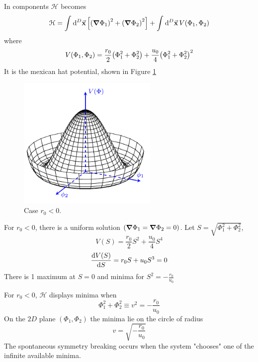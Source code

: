 \documentclass[../main/main.tex]{subfiles}
\begin{document}
In components \( \mathcal{H} \) becomes
\begin{equation}
  \mathcal{H} = \int_{}^{} \dd[D]{\va{x}} \qty[\qty(\grad \Phi _1)^2 + \qty(\grad \Phi _2)^2  ] + \int_{}^{} \dd[D]{\va{x}} V (\Phi _1, \Phi _2)
\end{equation}
where
\begin{equation}
  V (\Phi _1, \Phi _2) = \frac{r_0}{2} \qty(\Phi _1^2 + \Phi _2^2) + \frac{u_0}{4} \qty( \Phi _1^2 + \Phi _2^2)^2
\end{equation}
It is the mexican hat potential, shown in Figure \ref{fig:n_1}

\begin{figure}[h!]
\centering
\includegraphics[width=0.6\textwidth]{../lessons/n_image/3.pdf}
\caption{\label{fig:n_1} Case \( r_0 < 0 \).}
\end{figure}

For \( r_0 < 0 \), there is a uniform solution \( (\grad \Phi _1 = \grad \Phi _2 = 0) \). Let \( S = \sqrt{\Phi _1^2 + \Phi _2^2}  \),
\begin{equation}
  V (S) = \frac{r_0}{2} S^2 + \frac{u_0}{4} S^4
\end{equation}
\begin{equation}
  \dv{V(S)}{S} = r_0 S + u_0 S^3 = 0
\end{equation}
There is 1 maximum at \( S=0 \) and minima for \( S^2 = - \frac{r_0}{u_0} \)

For \( r_0 < 0 \), \( \mathcal{H} \) displays minima when
\begin{equation}
  \Phi _1^2 + \Phi _2^2 \equiv v^2 = - \frac{r_0}{u_0}
\end{equation}
On the \( 2D \) plane \( (\Phi _1, \Phi _2) \) the minima lie on the circle of radius
\begin{equation}
  v = \sqrt{- \frac{r_0}{u_0}}
\end{equation}
The spontaneous symmetry breaking occurs when the system "chooses" one of the infinite available minima.
\end{document}

